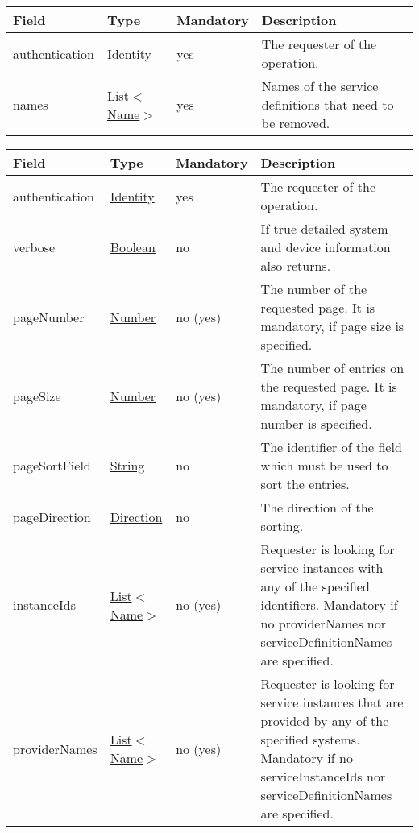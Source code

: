 \documentclass[a4paper]{arrowhead}
\newcommand{\pref}[1]{{\textcolor{ArrowheadGrey}{\hyperref[sec:model:primitives:#1]{#1}}}}
\begin{document}

\begin{table}[ht!]
\begin{tabularx}{\textwidth}{| p{2.5cm} | p{2.5cm} | p{2cm} | X |} \hline
\rowcolor{gray!33} Field & Type & Mandatory & Description \\ \hline
authentication & \hyperref[sec:model:Identity]{Identity} & yes & The requester of the operation. \\ \hline
names &  \pref{List}$<$\pref{Name}$>$ & yes & Names of the service definitions that need to be removed. \\ \hline
\end{tabularx}
\end{table}


\begin{table}[ht!]
\begin{tabularx}{\textwidth}{| p{5.6cm} | p{4.9cm} | p{2cm} | X |} \hline
\rowcolor{gray!33} Field & Type & Mandatory & Description \\ \hline
authentication & \hyperref[sec:model:Identity]{Identity} & yes & The requester of the ope\-ration. \\ \hline
verbose & \pref{Boolean} & no & If true detailed system and device information also returns. \\ \hline
pageNumber & \pref{Number} & no (yes) & The number of the requested page. It is mandatory, if page size is specified. \\ \hline
pageSize & \pref{Number} & no (yes) & The number of entries on the requested page. It is mandatory, if page number is specified. \\ \hline
pageSortField & \pref{String} & no & The identifier of the field which must be used to sort the entries. \\ \hline
pageDirection & \pref{Direction} & no & The direction of the sorting. \\ \hline
instanceIds &  \pref{List}$<$\pref{Name}$>$ & no (yes) & Requester is looking for service instances with any of the spe\-cified identifiers. Mandatory if no providerNames nor serviceDefinitionNames are spe\-cified. \\ \hline
providerNames &  \pref{List}$<$\pref{Name}$>$ & no (yes) & Requester is looking for service ins\-tances that are provided by any of the specified systems. Mandatory if no serviceInstanceIds nor serviceDefinitionNames are spe\-cified. \\ \hline
\end{tabularx}
\end{table}
\end{document}

